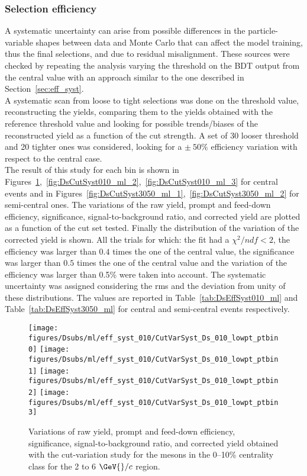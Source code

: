\clearpage
 
\subsubsection{Selection efficiency}
A systematic uncertainty can arise from possible differences in the particle-variable shapes between data and Monte Carlo 
that can affect the model training, thus the final selections, and due to residual misalignment. 
These sources were checked by repeating the analysis varying the threshold on the BDT output from the central value with an approach 
similar to the one described in Section~\ref{sec:eff_syst}. \\
A systematic scan from loose to tight selections was done on the threshold value, reconstructing the yields, comparing them to the yields obtained 
with the reference threshold value and looking for possible trends/biases of the reconstructed yield as a function of the cut strength. 
A set of 30 looser threshold and 20 tighter ones was considered, looking for a \(\pm~50\%\) efficiency 
variation with respect to the central case. \\
The result of this study for each \pt{} bin is shown in Figures~\ref{fig:DsCutSyst010_ml_1},~\ref{fig:DsCutSyst010_ml_2},~\ref{fig:DsCutSyst010_ml_3} 
for central events and in Figures~\ref{fig:DsCutSyst3050_ml_1},~\ref{fig:DsCutSyst3050_ml_2} for semi-central ones. The variations of the raw yield, prompt and
feed-down \Dsubs{} efficiency, significance, signal-to-background ratio, and corrected yield are plotted as a
function of the cut set tested. Finally the distribution of the variation of the corrected yield is shown. All the trials for which: the fit had a \(\chi^2/ndf < 2\), the efficiency was larger than \(0.4\) 
times the one of the central value, the significance was larger than \(0.5\) times the one of the central value and
the variation of the efficiency was larger than 0.5\% were taken into account. 
The systematic uncertainty was assigned considering the rms and the deviation from unity of these distributions. 
The values are reported in Table~\ref{tab:DsEffSyst010_ml} and Table~\ref{tab:DsEffSyst3050_ml} for central and semi-central events respectively.
\begin{figure}[!h]
  \begin{center}
    \texttt{[image: figures/Dsubs/ml/eff\_syst\_010/CutVarSyst\_Ds\_010\_lowpt\_ptbin0]}
    \texttt{[image: figures/Dsubs/ml/eff\_syst\_010/CutVarSyst\_Ds\_010\_lowpt\_ptbin1]}
    \texttt{[image: figures/Dsubs/ml/eff\_syst\_010/CutVarSyst\_Ds\_010\_lowpt\_ptbin2]}
    \texttt{[image: figures/Dsubs/ml/eff\_syst\_010/CutVarSyst\_Ds\_010\_lowpt\_ptbin3]}
    \caption{Variations of raw yield, prompt and feed-down \Dsubs{} efficiency, significance, signal-to-background ratio, 
            and corrected yield obtained with the cut-variation study for the \Dsubs{} mesons in the 0--10\% centrality class
            for the 2 to 6 \(\GeV{}/c\) \pt{} region.}
    \label{fig:DsCutSyst010_ml_1}
  \end{center}
\end{figure}
